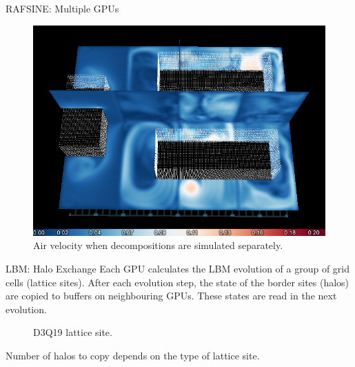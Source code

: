 \documentclass{beamer}
\begin{document}
\begin{frame}{RAFSINE: Multiple GPUs}

\begin{figure}[ht]
\begin{center}
\includegraphics[width=0.9\linewidth]{velocity_nohalos.png}
\end{center}
\caption{Air velocity when decompositions are simulated separately.}
\label{fig:problem2}
\end{figure}

\end{frame}

\begin{frame}{LBM: Halo Exchange}
Each GPU calculates the LBM evolution of a group of grid cells (lattice sites). After each evolution step, the state of the border sites (halos) are copied to buffers on neighbouring GPUs. These states are read in the next evolution.

\begin{figure}[!htb]
\centering
	\begin{tiny}
	\def\svgwidth{0.9\linewidth}
	
	\end{tiny}
	\caption{D3Q19 lattice site.}
	\label{fig:d2q9_1}
\end{figure}
Number of halos to copy depends on the type of lattice site.
\end{frame}
\end{document}
